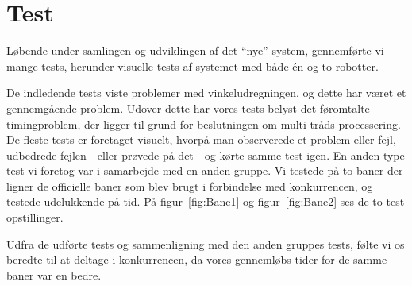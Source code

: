 \section{Test}
Løbende under samlingen og udviklingen af det “nye” system, gennemførte vi mange tests, herunder visuelle tests af systemet med både én og to robotter.

De indledende tests viste problemer med vinkeludregningen, og dette har været et gennemgående problem. Udover dette har vores tests belyst det føromtalte timingproblem, der ligger til grund for beslutningen om multi-tråds processering. De fleste tests er foretaget visuelt, hvorpå man observerede et problem eller fejl, udbedrede fejlen - eller prøvede på det - og kørte samme test igen.
En anden type test vi foretog var i samarbejde med en anden gruppe. Vi testede på to baner der ligner de officielle baner som blev brugt i forbindelse med konkurrencen, og testede udelukkende på tid. På figur~\vref{fig:Bane1} og figur~\vref{fig:Bane2} ses de to test opstillinger.


Udfra de udførte tests og sammenligning med den anden gruppes tests, følte vi os beredte til at deltage i konkurrencen, da vores gennemløbs tider for de samme baner var en bedre.